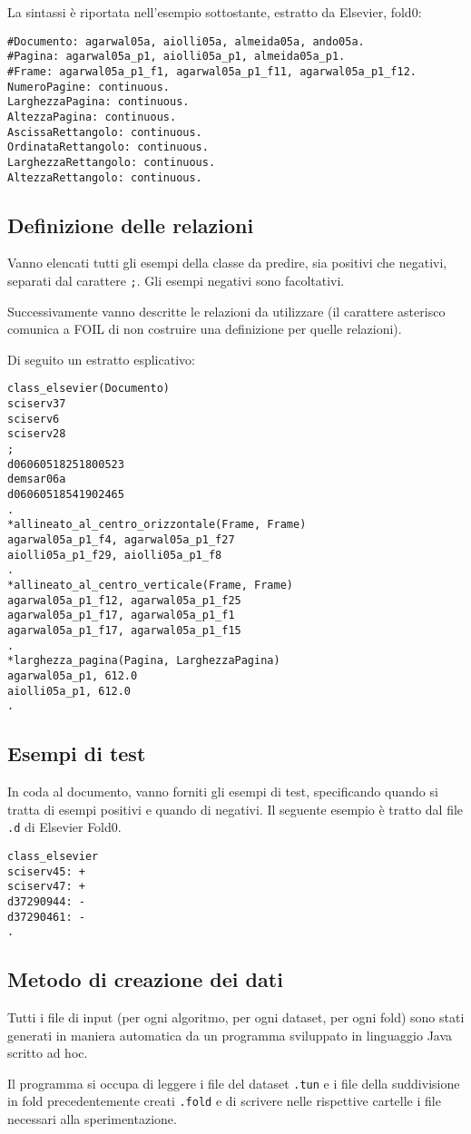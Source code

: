 La sintassi è riportata nell'esempio sottostante, estratto da Elsevier, fold0:
\begin{verbatim}
#Documento: agarwal05a, aiolli05a, almeida05a, ando05a.
#Pagina: agarwal05a_p1, aiolli05a_p1, almeida05a_p1.
#Frame: agarwal05a_p1_f1, agarwal05a_p1_f11, agarwal05a_p1_f12.
NumeroPagine: continuous.
LarghezzaPagina: continuous.
AltezzaPagina: continuous.
AscissaRettangolo: continuous.
OrdinataRettangolo: continuous.
LarghezzaRettangolo: continuous.
AltezzaRettangolo: continuous.
\end{verbatim}

\subsection{Definizione delle relazioni}
Vanno elencati tutti gli esempi della classe da predire, sia positivi che negativi, separati dal carattere \verb+;+.
Gli esempi negativi sono facoltativi.

Successivamente vanno descritte le relazioni da utilizzare (il carattere asterisco comunica a FOIL di non costruire una definizione per quelle relazioni).

Di seguito un estratto esplicativo:

\begin{verbatim}
class_elsevier(Documento)
sciserv37
sciserv6
sciserv28
;
d06060518251800523
demsar06a
d06060518541902465
.
*allineato_al_centro_orizzontale(Frame, Frame)
agarwal05a_p1_f4, agarwal05a_p1_f27
aiolli05a_p1_f29, aiolli05a_p1_f8
.
*allineato_al_centro_verticale(Frame, Frame)
agarwal05a_p1_f12, agarwal05a_p1_f25
agarwal05a_p1_f17, agarwal05a_p1_f1
agarwal05a_p1_f17, agarwal05a_p1_f15
.
*larghezza_pagina(Pagina, LarghezzaPagina)
agarwal05a_p1, 612.0
aiolli05a_p1, 612.0
.
\end{verbatim}


\subsection{Esempi di test}
In coda al documento, vanno forniti gli esempi di test, specificando quando si tratta di esempi positivi e quando di negativi. Il seguente esempio è tratto dal file \verb+.d+ di Elsevier Fold0.

\begin{verbatim}
class_elsevier
sciserv45: +
sciserv47: +
d37290944: -
d37290461: -
.
\end{verbatim}

\subsection{Metodo di creazione dei dati}
Tutti i file di input (per ogni algoritmo, per ogni dataset, per ogni fold) sono stati generati in maniera automatica da un programma sviluppato in linguaggio Java scritto ad hoc.

Il programma si occupa di leggere i file del dataset \verb+.tun+ e i file della suddivisione in fold precedentemente creati \verb+.fold+ e di scrivere nelle rispettive cartelle i file necessari alla sperimentazione.